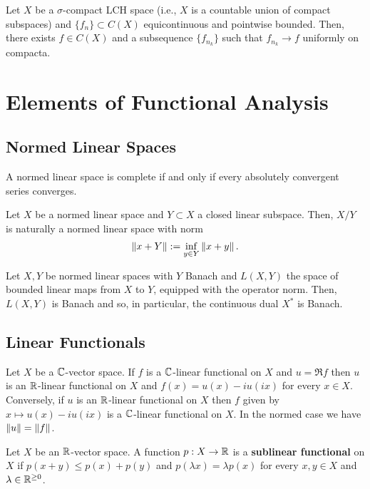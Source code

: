 \documentclass[11pt]{article}
\begin{document}
\begin{theorem}
Let $X$ be a $\sigma$-compact LCH space (i.e., $X$ is a countable union of compact subspaces) and $\{f_n\}\subset C(X)$ equicontinuous and pointwise bounded. Then, there exists $f\in C(X)$ and a subsequence $\{f_{n_k}\}$ such that $f_{n_k}\to f$ uniformly on compacta.
\end{theorem}

\section{Elements of Functional Analysis}
\subsection{Normed Linear Spaces}
\begin{theorem}
A normed linear space is complete if and only if every absolutely convergent series converges.
\end{theorem}

Let $X$ be a normed linear space and $Y\subset X$ a closed linear subspace. Then, $X/Y$ is naturally a normed linear space with norm
$$\left\lVert x+Y\right\rVert:=\inf_{y\in Y}\left\lVert x+y\right\rVert.$$

\begin{theorem}
Let $X,Y$ be normed linear spaces with $Y$ Banach and $L(X,Y)$ the space of bounded linear maps from $X$ to $Y$, equipped with the operator norm. Then, $L(X,Y)$ is Banach and so, in particular, the continuous dual $X^*$ is Banach.
\end{theorem}

\subsection{Linear Functionals}
\begin{proposition}
Let $X$ be a $\mathbb{C}$-vector space. If $f$ is a $\mathbb{C}$-linear functional on $X$ and $u=\Re f$ then $u$ is an $\mathbb{R}$-linear functional on $X$ and $f(x)=u(x)-iu(ix)$ for every $x\in X$. Conversely, if $u$ is an $\mathbb{R}$-linear functional on $X$ then $f$ given by $x\mapsto u(x)-iu(ix)$ is a $\mathbb{C}$-linear functional on $X$. In the normed case we have $\left\lVert u\right\rVert=\left\lVert f\right\rVert$.
\end{proposition}

\begin{definition}
Let $X$ be an $\mathbb{R}$-vector space. A function $p: X\to\mathbb{R}$ is a \textbf{sublinear functional} on $X$ if $p(x+y)\leq p(x)+p(y)$ and $p(\lambda x)=\lambda p(x)$ for every $x,y\in X$ and $\lambda\in\mathbb{R}^{\geq0}$.
\end{definition}
\end{document}
